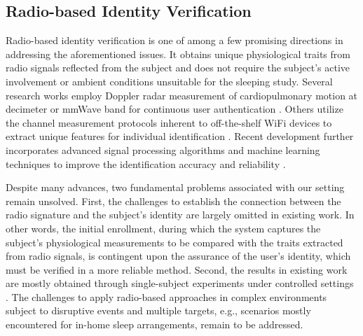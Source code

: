\subsection{Radio-based Identity Verification}
Radio-based identity verification is one of among a few promising directions in addressing the aforementioned issues. It obtains unique physiological traits from radio signals reflected from the subject and does not require the subject's active involvement or ambient conditions unsuitable for the sleeping study. Several research works employ Doppler radar measurement of cardiopulmonary motion at decimeter or mmWave band for continuous user authentication \cite{ChenDopplerSignaturesRadar2008,MolchanovTargetClassificationUsing2011,RahmanNoncontactDopplerRadar2016,VanDorpFeaturebasedHumanMotion2008}. Others utilize the channel measurement protocols inherent to off-the-shelf WiFi devices to extract unique features for individual identification \cite{AbdelnasserUbiBreatheUbiquitousNoninvasive2015, LiuTrackingVitalSigns2015, ZhangWifiidHumanIdentification2016}. Recent development further incorporates advanced signal processing algorithms and machine learning techniques to improve the identification accuracy and reliability \cite{LiuContinuousUserVerificationb,IslamIdentityAuthenticationOSA2020}.

Despite many advances, two fundamental problems associated with our setting remain unsolved. First, %
the challenges to establish the connection between the radio signature and the subject's identity are largely omitted in existing work. In other words, the initial enrollment, during which the system captures the subject's physiological measurements to be compared with the traits extracted from radio signals, is contingent upon the assurance of the user's identity, which must be verified in a more reliable method. Second, the results in existing work are mostly obtained through single-subject experiments under controlled settings \cite{rahman_doppler_2018,lin_cardiac_2017,shi_contactless_2018,islam_identity_2019}. The challenges to apply radio-based approaches in complex environments subject to disruptive events and multiple targets, e.g., scenarios mostly encountered for in-home sleep arrangements, remain to be addressed.

